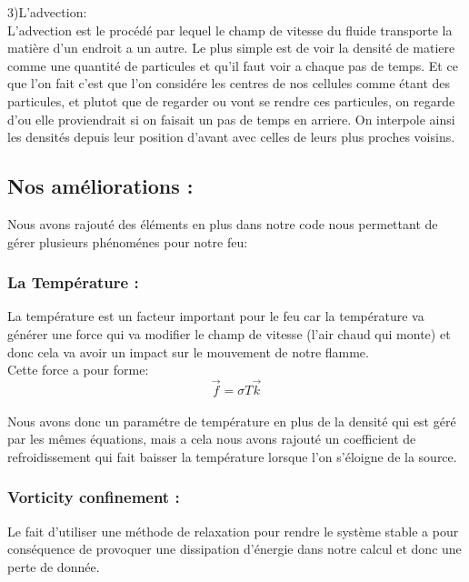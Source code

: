 \documentclass[a4paper,10pt]{article}
\begin{document}
	3)L'advection:\\
L'advection est le procédé par lequel le champ de vitesse du fluide transporte la matière d'un endroit a un autre. Le plus simple est de voir la densité de matiere comme une quantité de particules et qu'il faut voir a chaque pas de temps. Et ce que l'on fait c'est que l'on considére les centres de nos cellules comme étant des particules, et plutot que de regarder ou vont se rendre ces particules, on regarde d'ou elle proviendrait si on faisait un pas de temps en arriere. On interpole ainsi les densités depuis leur position d'avant avec celles de leurs plus proches voisins.\\

\subsection{Nos améliorations :}
Nous avons rajouté des éléments en plus dans notre code nous permettant de gérer plusieurs phénoménes pour notre feu:\\
 
\subsubsection{La Température :}
La température est un facteur important pour le feu car la température va générer une force qui va modifier le champ de vitesse (l'air chaud qui monte) et donc cela va avoir un impact sur le mouvement de notre flamme.\\
Cette force a pour forme:\\
\begin{equation}
	\vec{f} = \sigma T \vec{k} 
\end{equation}
\\

Nous avons donc un paramétre de température en plus de la densité qui est géré par les mêmes équations, mais a cela nous avons rajouté un coefficient de refroidissement qui fait baisser la température lorsque l'on s'éloigne de la source.\\

\subsubsection{Vorticity confinement :}
Le fait d'utiliser une méthode de relaxation pour rendre le système stable a pour conséquence de provoquer une dissipation d'énergie dans notre calcul et donc une perte de donnée. \\
\end{document}
